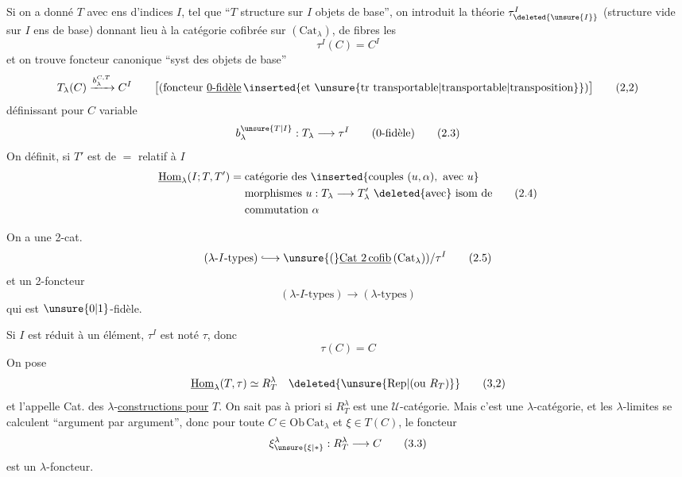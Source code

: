  Si on a donné $T$ avec ens d'indices $I$, tel que
``$T$ structure sur $I$ objets de base'', on introduit la
théorie $\tau_{\deleted{\unsure{I}}}^{I}$ (structure vide sur $I$ ens de base)
donnant lieu à la catégorie cofibrée sur $(\mathrm{Cat}_{\lambda})$, de fibres les
\[
\tau^I(C)=C^I\tag*{(2.1)}
\]
et on trouve   foncteur canonique ``syst des objets
de base''
\[
T_{\lambda}(C)\xrightarrow{b_{\lambda}^{C,T}}C^{I}\qquad
\bigl[(\text{foncteur }\underline{\text{0-fidèle}}\,\inserted{\text{et }\unsure{\text{tr transportable}|\text{transportable}|\text{transposition}}})\bigr]\tag*{(2,2)}
\]
définissant pour $C$ variable
\[
b_{\lambda}^{\unsure{T|I}}:T_{\lambda}\longrightarrow\tau^{I}\qquad(\text{0-fidèle})\tag*{(2.3)}
\]
On définit, si $T'$ est de $=$ relatif à $I$
\[
\begin{aligned}
\underline{\mathrm{Hom}}_\lambda(I;T,T')={}&\text{catégorie des }\inserted{\text{couples }(u,\alpha),\ \text{avec }u}\\
 &\text{morphismes } u:T_\lambda\longrightarrow T'_\lambda\ \text{\deleted{avec} isom de}\\
 &\text{commutation }\alpha
\end{aligned}\tag*{(2.4)}
\]

On a une  2-cat.
\[
(\lambda\text{-}I\text{-types})\lhook\joinrel\longrightarrow
\unsure{\text{(}}\underline{\mathrm{Cat}\ 2\,\mathrm{cofib}}\,(\mathrm{Cat}_{\lambda}))/\tau^{I}\tag*{(2.5)}
\]
et un 2-foncteur
\[
(\lambda\text{-}I\text{-types})\longrightarrow(\lambda\text{-types})\tag*{(2.6)}
\]
qui est $\unsure{0|1}$-fidèle.

 Si $I$ est réduit à un élément, $\tau^I$ est noté  $\tau$, donc
\[
\tau(C)=C\tag*{(3.1)}
\]
 On pose
\[
\underline{\mathrm{Hom}}_\lambda(T,\tau)\simeq R_T^\lambda\quad\deleted{\unsure{\mathrm{Rep}|(\text{ou }R_T)}}\tag*{(3,2)}
\]
et l'appelle Cat. des $\lambda$-\uline{constructions pour} $T$. On 
 sait pas à priori si $R_T^\lambda$ est une $\mathcal U$-catégorie. Mais
c'est une  $\lambda$-catégorie, et les $\lambda$-limites se calculent
``argument par argument'', donc pour toute $C\in\mathrm{Ob}\,\mathrm{Cat}_\lambda$
et $\xi\in T(C)$, le foncteur
\[
\xi_{\unsure{\xi|*}}^\lambda:R_T^\lambda\longrightarrow C\tag*{(3.3)}
\]
 est un $\lambda$-foncteur.

